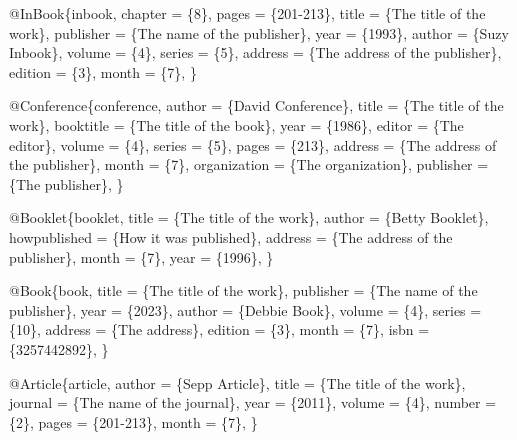 \documentclass[
  stu,
  floatsintext,
  longtable,
  a4paper,
  nolmodern,
  notxfonts,
  notimes,
  donotrepeattitle,
  colorlinks=true,linkcolor=blue,citecolor=blue,urlcolor=blue]{apa7}
\newenvironment{Shaded}{\begin{snugshade}}{\end{snugshade}}
\newcommand{\NormalTok}[1]{\textcolor[rgb]{0.00,0.23,0.31}{#1}}
\begin{document}
\begin{Shaded}
\begin{Highlighting}[]
\NormalTok{    @InBook\{inbook,}
\NormalTok{        chapter   = \{8\},}
\NormalTok{        pages     = \{201{-}213\},}
\NormalTok{        title     = \{The title of the work\},}
\NormalTok{        publisher = \{The name of the publisher\},}
\NormalTok{        year      = \{1993\},}
\NormalTok{        author    = \{Suzy Inbook\},}
\NormalTok{        volume    = \{4\},}
\NormalTok{        series    = \{5\},}
\NormalTok{        address   = \{The address of the publisher\},}
\NormalTok{        edition   = \{3\},}
\NormalTok{        month     = \{7\},}
\NormalTok{    \}}
    
\NormalTok{    @Conference\{conference,}
\NormalTok{        author       = \{David Conference\},}
\NormalTok{        title        = \{The title of the work\},}
\NormalTok{        booktitle    = \{The title of the book\},}
\NormalTok{        year         = \{1986\},}
\NormalTok{        editor       = \{The editor\},}
\NormalTok{        volume       = \{4\},}
\NormalTok{        series       = \{5\},}
\NormalTok{        pages        = \{213\},}
\NormalTok{        address      = \{The address of the publisher\},}
\NormalTok{        month        = \{7\},}
\NormalTok{        organization = \{The organization\},}
\NormalTok{        publisher    = \{The publisher\},}
\NormalTok{    \}}
    
\NormalTok{    @Booklet\{booklet,}
\NormalTok{        title        = \{The title of the work\},}
\NormalTok{        author       = \{Betty Booklet\},}
\NormalTok{        howpublished = \{How it was published\},}
\NormalTok{        address      = \{The address of the publisher\},}
\NormalTok{        month        = \{7\},}
\NormalTok{        year         = \{1996\},}
\NormalTok{    \}}
    
\NormalTok{    @Book\{book,}
\NormalTok{        title     = \{The title of the work\},}
\NormalTok{        publisher = \{The name of the publisher\},}
\NormalTok{        year      = \{2023\},}
\NormalTok{        author    = \{Debbie Book\},}
\NormalTok{        volume    = \{4\},}
\NormalTok{        series    = \{10\},}
\NormalTok{        address   = \{The address\},}
\NormalTok{        edition   = \{3\},}
\NormalTok{        month     = \{7\},}
\NormalTok{        isbn      = \{3257442892\},}
\NormalTok{    \}}
    
\NormalTok{    @Article\{article,}
\NormalTok{        author  = \{Sepp Article\},}
\NormalTok{        title   = \{The title of the work\},}
\NormalTok{        journal = \{The name of the journal\},}
\NormalTok{        year    = \{2011\},}
\NormalTok{        volume  = \{4\},}
\NormalTok{        number  = \{2\},}
\NormalTok{        pages   = \{201{-}213\},}
\NormalTok{        month   = \{7\},}
\NormalTok{    \}}
    

\end{Highlighting}
\end{Shaded}
\end{document}
